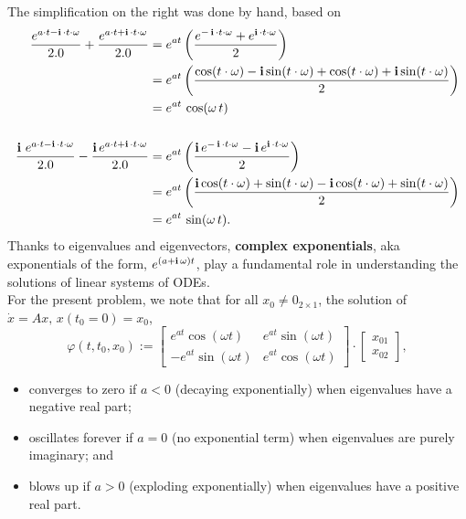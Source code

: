 The simplification on the right was done by hand, based on  
\begin{align*}
    \frac{e^{a \cdot t - \mathop{\bm{\mathrm i}} \cdot t \cdot \omega}}{2.0} +  \frac{e^{a \cdot t + \mathop{\bm{\mathrm i}} \cdot t \cdot \omega}}{2.0}&=  e^{at} \left( \frac{e^{ - \mathop{\bm{\mathrm i}} \cdot t \cdot \omega} + e^{\mathop{\bm{\mathrm i}} \cdot t \cdot \omega}}{2} \right)\\
     &= e^{at} \left( \frac{ \cos(t \cdot \omega)  -  \mathop{\bm{\mathrm i}} \sin(t \cdot \omega) + \cos(t \cdot \omega) + \mathop{\bm{\mathrm i}} \sin(t \cdot \omega)}{2} \right) \\
    &= e^{at} \, \cos(\omega\, t) \\
    \\
        \frac{\mathop{\bm{\mathrm i}} \, e^{a \cdot t - \mathop{\bm{\mathrm i}} \cdot t \cdot \omega}}{2.0} -  \frac{\mathop{\bm{\mathrm i}} e^{a \cdot t + \mathop{\bm{\mathrm i}} \cdot t \cdot \omega}}{2.0}&=  e^{at} \left( \frac{ \mathop{\bm{\mathrm i}} e^{ - \mathop{\bm{\mathrm i}} \cdot t \cdot \omega} - \mathop{\bm{\mathrm i}}  e^{\mathop{\bm{\mathrm i}} \cdot t \cdot \omega}}{2} \right)\\
        &= e^{at} \left( \frac{ \mathop{\bm{\mathrm i}} \cos(t \cdot \omega)  +  \sin(t \cdot \omega)- \mathop{\bm{\mathrm i}} \cos(t \cdot \omega) + \sin(t \cdot \omega)}{2} \right) \\
    &= e^{at} \, \sin(\omega\, t) .  
\end{align*}
Thanks to eigenvalues and eigenvectors, \textbf{complex exponentials}, aka exponentials of the form, $e^{\left( a + \mathop{\bm{\mathrm i}} \omega \right) t}$, play a fundamental role in understanding the solutions of linear systems of ODEs.\\

For the present problem, we note that for all $x_0 \neq 0_{2 \times 1}$, the solution of $\dot x = Ax, \, x(t_0=0)=x_0$,
   $$\varphi(t, t_0,x_0):=\left[
\begin{array}{rr}
e^{a t} \cos(\omega t) & e^{a t} \sin(\omega t) \\
-e^{a t} \sin(\omega t) & e^{a t} \cos(\omega t) 
\end{array}
\right] \cdot \left[ \begin{array}{c}
x_{01} \\
x_{02}
\end{array}
\right], $$
\begin{itemize}
    \item converges to zero if $a < 0$ (decaying exponentially) when eigenvalues have a negative real part;
    \item oscillates forever if $a = 0$ (no exponential term) when eigenvalues are purely imaginary; and
    \item blows up if $a >0$ (exploding exponentially) when eigenvalues have a positive real part. 
\end{itemize}

